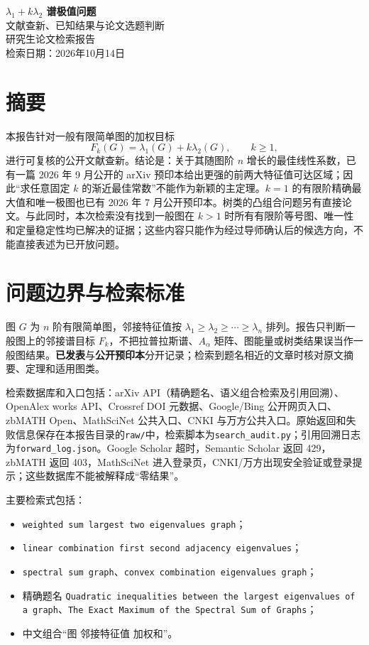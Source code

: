 \documentclass[11pt,a4paper]{article}
\begin{document}
\begin{center}
{\LARGE\bfseries $\lambda_1+k\lambda_2$ 谱极值问题}\\[5pt]
{\Large 文献查新、已知结果与论文选题判断}\\[8pt]
{\large 研究生论文检索报告}\\[5pt]
检索日期：2026年10月14日
\end{center}

\section*{摘要}
本报告针对一般有限简单图的加权目标
\[
 F_k(G)=\lambda_1(G)+k\lambda_2(G),\qquad k\ge 1,
\]
进行可复核的公开文献查新。结论是：关于其随图阶 $n$ 增长的最佳线性系数，已有一篇 2026 年 9 月公开的 arXiv 预印本给出更强的前两大特征值可达区域；因此“求任意固定 $k$ 的渐近最佳常数”不能作为新颖的主定理。$k=1$ 的有限阶精确最大值和唯一极图也已有 2026 年 7 月公开预印本。树类的凸组合问题另有直接论文。与此同时，本次检索没有找到一般图在 $k>1$ 时所有有限阶等号图、唯一性和定量稳定性均已解决的证据；这些内容只能作为经过导师确认后的候选方向，不能直接表述为已开放问题。

\section{问题边界与检索标准}
图 $G$ 为 $n$ 阶有限简单图，邻接特征值按
$\lambda_1\ge\lambda_2\ge\cdots\ge\lambda_n$ 排列。报告只判断一般图上的邻接谱目标 $F_k$，不把拉普拉斯谱、$A_\alpha$ 矩阵、图能量或树类结果误当作一般图结果。\textbf{已发表}与\textbf{公开预印本}分开记录；检索到题名相近的文章时核对原文摘要、定理和适用图类。

检索数据库和入口包括：arXiv API（精确题名、语义组合检索及引用回溯）、OpenAlex works API、Crossref DOI 元数据、Google/Bing 公开网页入口、zbMATH Open、MathSciNet 公共入口、CNKI 与万方公共入口。原始返回和失败信息保存在本报告目录的\texttt{raw/}中，检索脚本为\texttt{search\_audit.py}；引用回溯日志为\texttt{forward\_log.json}。Google Scholar 超时，Semantic Scholar 返回 429，zbMATH 返回 403，MathSciNet 进入登录页，CNKI/万方出现安全验证或登录提示；这些数据库不能被解释成“零结果”。

主要检索式包括：
\begin{itemize}[leftmargin=2.2em]
\item \texttt{weighted sum largest two eigenvalues graph}；
\item \texttt{linear combination first second adjacency eigenvalues}；
\item \texttt{spectral sum graph}、\texttt{convex combination eigenvalues graph}；
\item 精确题名 \texttt{Quadratic inequalities between the largest eigenvalues of a graph}、\texttt{The Exact Maximum of the Spectral Sum of Graphs}；
\item 中文组合“图 邻接特征值 加权和”。
\end{itemize}
\end{document}
